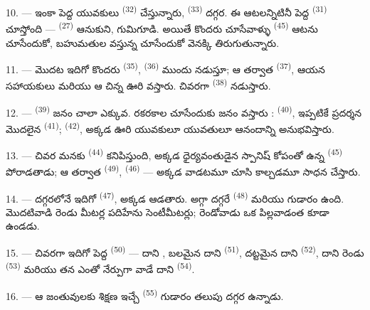 10. --- ఇంకా పెద్ద యువకులు  \textsuperscript{(32)} చేస్తున్నారు,
 \textsuperscript{(33)} దగ్గర. ఈ ఆటలన్నిటినీ పెద్ద 
\textsuperscript{(31)} చూస్తోంది —  \textsuperscript{(27)} 
ఆనుకుని,  గుమిగూడి. అయితే కొందరు చూసేవాళ్ళు 
\textsuperscript{(45)} ఆటను చూసేందుకో, బహుమతుల  వస్తున్న
 చూసేందుకో వెనక్కి తిరుగుతున్నారు.

11. --- మొదట ఇదిగో కొందరు  \textsuperscript{(35)}, 
\textsuperscript{(36)} ముందు నడుస్తూ; ఆ తర్వాత  \textsuperscript{(37)}, ఆయన
సహాయకులు మరియు ఆ చిన్న ఊరి  వస్తారు. చివరగా 
\textsuperscript{(38)} నడుస్తారు.

\VUsaut{5.0mm}
\VUsaut{3.6mm}

12. ---  \textsuperscript{(39)} జనం చాలా ఎక్కువ. రకరకాల
 చూసేందుకు జనం వస్తారు :  \textsuperscript{(40)},
ఇప్పటికే ప్రదర్శన మొదలైన  \textsuperscript{(41)}; 
\textsuperscript{(42)}, అక్కడ ఊరి యువకులూ యువతులూ  ఆనందాన్ని అనుభవిస్తారు.

13. --- చివర మనకు  \textsuperscript{(44)} కనిపిస్తుంది, అక్కడ ధైర్యవంతుడైన
స్పానిష్  కోపంతో ఉన్న  \textsuperscript{(45)} పోరాడతాడు; ఆ
తర్వాత  \textsuperscript{(49)}, 
\textsuperscript{(46)} — అక్కడ  వాడటమూ  చూసి కాల్చడమూ సాధన
చేస్తారు.

14. --- దగ్గరలోనే ఇదిగో  \textsuperscript{(47)}, అక్కడ
  ఆడతారు. అగ్గా దగ్గరే 
\textsuperscript{(48)} మరియు  గుడారం ఉంది. మొదటివాడి  రెండు
మీటర్ల పదిహేను సెంటీమీటర్లు; రెండోవాడు ఒక పిల్లవాడంత కూడా ఉండడు.

15. --- చివరగా ఇదిగో పెద్ద  \textsuperscript{(50)} — దాని
, బలమైన  దాని  \textsuperscript{(51)},
దట్టమైన  దాని  \textsuperscript{(52)}, దాని రెండు
 \textsuperscript{(53)} మరియు తన  ఎంతో నేర్పుగా వాడే దాని
 \textsuperscript{(54)}.

16. --- ఆ జంతువులకు శిక్షణ ఇచ్చే  \textsuperscript{(55)} గుడారం తలుపు
దగ్గర ఉన్నాడు.

\VUsaut{6.0mm}
\VUfilet{22mm}
